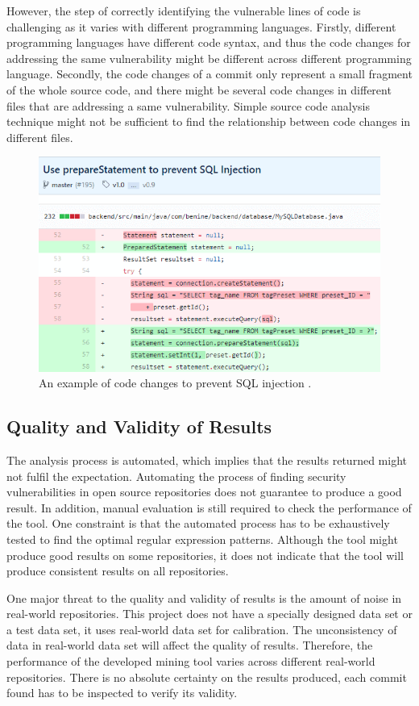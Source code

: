 \documentclass[12pt, a4paper]{report}
\begin{document}
However, the step of correctly identifying the vulnerable lines of code is challenging as it varies
with different programming languages. Firstly, different programming languages have different code
syntax, and thus the code changes for addressing the same vulnerability might be different across
different programming language. Secondly, the code changes of a commit only represent a small
fragment of the whole source code, and there might be several code changes in different files that
are addressing a same vulnerability. Simple source code analysis technique might not be sufficient
to find the relationship between code changes in different files.

\begin{figure}[H]
  \centering
  \includegraphics[width=.75\textwidth]{images/code_diff.png}
  \caption{An example of code changes to prevent SQL injection \cite{code_diff}.}
  \label{figure:code_diff}
\end{figure}

\subsection{Quality and Validity of Results}
The analysis process is automated, which implies that the results returned might not fulfil the
expectation. Automating the process of finding security vulnerabilities in open source repositories
does not guarantee to produce a good result. In addition, manual evaluation is still required to
check the performance of the tool. One constraint is that the automated process has to be
exhaustively tested to find the optimal regular expression patterns. Although the tool might produce
good results on some repositories, it does not indicate that the tool will produce consistent
results on all repositories.

One major threat to the quality and validity of results is the amount of noise in real-world
repositories. This project does not have a specially designed data set or a test data set, it uses
real-world data set for calibration. The unconsistency of data in real-world data set will affect
the quality of results. Therefore, the performance of the developed mining tool varies across
different real-world repositories. There is no absolute certainty on the results produced, each
commit found has to be inspected to verify its validity.
\end{document}
